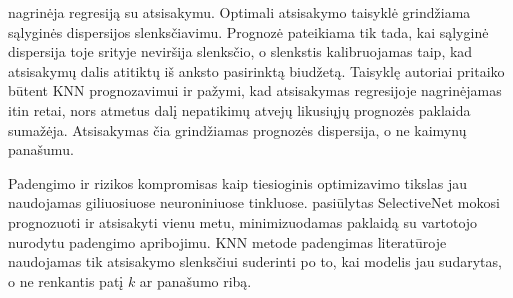 \cite{denis2020} nagrinėja regresiją su atsisakymu.
Optimali atsisakymo taisyklė grindžiama sąlyginės dispersijos slenksčiavimu.
Prognozė pateikiama tik tada, kai sąlyginė dispersija toje srityje neviršija slenksčio, o slenkstis kalibruojamas taip, kad atsisakymų dalis atitiktų iš anksto pasirinktą biudžetą.
Taisyklę autoriai pritaiko būtent KNN prognozavimui ir pažymi, kad atsisakymas regresijoje nagrinėjamas itin retai, nors atmetus dalį nepatikimų atvejų likusiųjų prognozės paklaida sumažėja.
Atsisakymas čia grindžiamas prognozės dispersija, o ne kaimynų panašumu.

Padengimo ir rizikos kompromisas kaip tiesioginis optimizavimo tikslas jau naudojamas giliuosiuose neuroniniuose tinkluose.
\cite{geifman2019} pasiūlytas SelectiveNet mokosi prognozuoti ir atsisakyti vienu metu, minimizuodamas paklaidą su vartotojo nurodytu padengimo apribojimu.
KNN metode padengimas literatūroje naudojamas tik atsisakymo slenksčiui suderinti po to, kai modelis jau sudarytas, o ne renkantis patį $k$ ar panašumo ribą.


